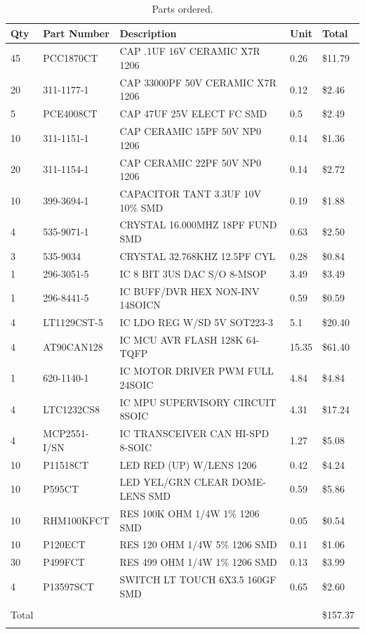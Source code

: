 \documentclass[12pt]{report}
\begin{document}
  \begin{table}[H]
    \caption{Parts ordered.}
    \label{table:parts_ordered}
    \centering
    \begin{small}
    \begin{tabular}[c]{|l|l|l|l|l|}
    \hline
    Qty&Part Number&Description&Unit&Total\\
    \hline
    45&PCC1870CT&CAP .1UF 16V CERAMIC X7R 1206&0.26&\$11.79\\
    20&311-1177-1&CAP 33000PF 50V CERAMIC X7R 1206&0.12&\$2.46\\
    5&PCE4008CT&CAP 47UF 25V ELECT FC SMD&0.5&\$2.49\\
    10&311-1151-1&CAP CERAMIC 15PF 50V NP0 1206&0.14&\$1.36\\
    20&311-1154-1&CAP CERAMIC 22PF 50V NP0 1206&0.14&\$2.72\\
    10&399-3694-1&CAPACITOR TANT 3.3UF 10V 10\% SMD&0.19&\$1.88\\
    4&535-9071-1&CRYSTAL 16.000MHZ 18PF FUND SMD&0.63&\$2.50\\
    3&535-9034&CRYSTAL 32.768KHZ 12.5PF CYL&0.28&\$0.84\\
    1&296-3051-5&IC 8 BIT 3US DAC S/O 8-MSOP&3.49&\$3.49\\
    1&296-8441-5&IC BUFF/DVR HEX NON-INV 14SOICN&0.59&\$0.59\\
    4&LT1129CST-5&IC LDO REG W/SD 5V SOT223-3&5.1&\$20.40\\
    4&AT90CAN128&IC MCU AVR FLASH 128K 64-TQFP&15.35&\$61.40\\
    1&620-1140-1&IC MOTOR DRIVER PWM FULL 24SOIC&4.84&\$4.84\\
    4&LTC1232CS8&IC MPU SUPERVISORY CIRCUIT 8SOIC&4.31&\$17.24\\
    4&MCP2551-I/SN&IC TRANSCEIVER CAN HI-SPD 8-SOIC&1.27&\$5.08\\
    10&P11518CT&LED RED (UP) W/LENS 1206&0.42&\$4.24\\
    10&P595CT&LED YEL/GRN CLEAR DOME-LENS SMD&0.59&\$5.86\\
    10&RHM100KFCT&RES 100K OHM 1/4W 1\% 1206 SMD&0.05&\$0.54\\
    10&P120ECT&RES 120 OHM 1/4W 5\% 1206 SMD&0.11&\$1.06\\
    30&P499FCT&RES 499 OHM 1/4W 1\% 1206 SMD&0.13&\$3.99\\
    4&P13597SCT&SWITCH LT TOUCH 6X3.5 160GF SMD&0.65&\$2.60\\
    \hline
    &&&&\\
    Total&&&&\$157.37\\
    &&&&\\
    \hline
    \end{tabular}
    \end{small}
  \end{table}
\end{document}
